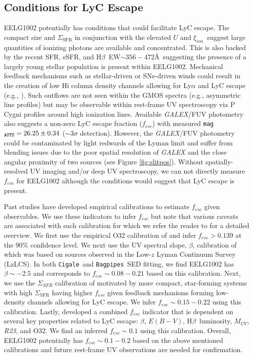 \documentclass[twocolumn,tight,times,linenumbers]{aastex631}
\newcommand{\hbeta}{H$\beta$}
\newcommand{\xiion}{$\xi_{ion}$}
\newcommand{\cigale}{\texttt{Cigale}}
\newcommand{\bagpipes}{\texttt{Bagpipes}}
\begin{document}
		\subsection{Conditions for LyC Escape}
		\label{sec:fesc}
		
		EELG1002 potentially has conditions that could facilitate LyC escape. The compact size and $\Sigma_\textrm{SFR}$ in conjunction with the elevated $U$ and \xiion~suggest large quantities of ionizing photons are available and concentrated. This is also backed by the recent SFR, sSFR, and  \hbeta~EW$\sim 356 - 472$\AA~suggesting the presence of a largely young stellar population is present within EELG1002. Mechanical feedback mechanisms such as stellar-driven or SNe-driven winds could result in the creation of low H{\sc i} column density channels allowing for Ly$\alpha$ and LyC escape (e.g., \citealt{Yang2016,Pucha2022,Reddy2022}). Such outflows are not seen within the GMOS spectra (e.g., asymmetric line profiles) but may be observable within rest-frame UV spectroscopy via P Cygni profiles around high ionization lines. Available \textit{GALEX}/FUV photometry also suggests a non-zero LyC escape fraction ($f_{esc}$) with measured \texttt{mag}$_\textrm{\texttt{AUTO}} = 26.25\pm0.34$ ($\sim 3\sigma$ detection). However, the \textit{GALEX}/FUV photometry could be contaminated by light redwards of the Lyman limit and suffer from blending issues due to the poor spatial resolution of \textit{GALEX} and the close angular proximity of two sources (see Figure \ref{fig:slitpos}). Without spatially-resolved UV imaging and/or deep UV spectroscopy, we can not directly measure $f_{esc}$ for EELG1002 although the conditions would suggest that LyC escape is present.
		
		Past studies have developed empirical calibrations to estimate $f_{esc}$ given observables. We use these indicators to infer $f_{esc}$ but note that various caveats are associated with each calibration for which we refer the reader to \cite{Choustikov2024} for a detailed overview. We first use the empirical O32 calibration of \cite{Faisst2016_O32} and infer $f_{esc} > 0.139$ at the 90\% confidence level. We next use the UV spectral slope, $\beta$, calibration of \cite{Chisholm2022} which was based on sources observed in the Low-$z$ Lyman Continuum Survey (LzLCS). In both \cigale~and \bagpipes~SED fitting, we find EELG1002 has $\beta \sim -2.5$ and corresponds to $f_{esc} \sim 0.08 - 0.21$ based on this calibration. Next, we use the $\Sigma_{SFR}$ calibration of \cite{Naidu2020} motivated by more compact, star-forming systems with high $\Sigma_\textrm{SFR}$ having higher $f_{esc}$ given feedback mechanisms forming low-density channels allowing for LyC escape. We infer $f_{esc} \sim 0.15 - 0.22$ using this calibration. Lastly, \cite{Choustikov2024} developed a combined $f_{esc}$ indicator that is dependent on several key properties related to LyC escape: $\beta$, $E(B-V)$, \hbeta~luminosity, $M_{UV}$, \textit{R23}, and O32. We find an inferred $f_{esc} \sim 0.1$ using this calibration. Overall, EELG1002 potentially has $f_{esc} \sim 0.1 - 0.2$ based on the above mentioned calibrations and future rest-frame UV observations are needed for confirmation. 
\end{document}

